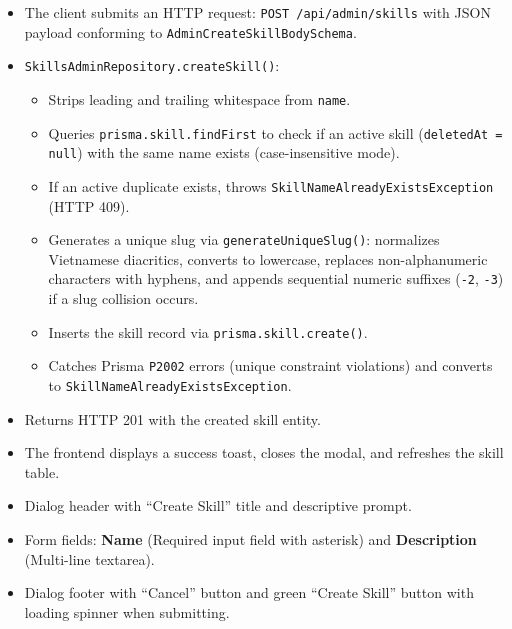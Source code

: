 \begin{itemize}[leftmargin=1.6em,topsep=3pt,itemsep=2pt,parsep=0pt,label=$\bullet$]
    \item The client submits an HTTP request: \texttt{POST /api/admin/skills} with JSON payload conforming to \texttt{AdminCreateSkillBodySchema}.
    \item \texttt{SkillsAdminRepository.createSkill()}:
        \begin{itemize}[leftmargin=1.6em,topsep=2pt,itemsep=2pt,parsep=0pt]
            \item Strips leading and trailing whitespace from \texttt{name}.
            \item Queries \texttt{prisma.skill.findFirst} to check if an active skill (\texttt{deletedAt = null}) with the same name exists (case-insensitive mode).
            \item If an active duplicate exists, throws \texttt{SkillName\-Already\-Exists\-Exception} (HTTP 409).
            \item Generates a unique slug via \texttt{generateUniqueSlug()}: normalizes Vietnamese diacritics, converts to lowercase, replaces non-alphanumeric characters with hyphens, and appends sequential numeric suffixes (\texttt{-2}, \texttt{-3}) if a slug collision occurs.
            \item Inserts the skill record via \texttt{prisma.skill.create()}.
            \item Catches Prisma \texttt{P2002} errors (unique constraint violations) and converts to \texttt{SkillName\-Already\-Exists\-Exception}.
        \end{itemize}
    \item Returns HTTP 201 with the created skill entity.
    \item The frontend displays a success toast, closes the modal, and refreshes the skill table.
\end{itemize}

\begin{itemize}[leftmargin=1.6em,topsep=3pt,itemsep=2pt,parsep=0pt,label=$\bullet$]
    \item Dialog header with ``Create Skill'' title and descriptive prompt.
    \item Form fields: \textbf{Name} (Required input field with asterisk) and \textbf{Description} (Multi-line textarea).
    \item Dialog footer with ``Cancel'' button and green ``Create Skill'' button with loading spinner when submitting.
\end{itemize}

